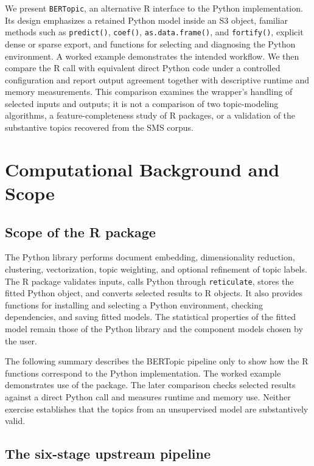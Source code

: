 \documentclass[12pt]{article}
\newcommand{\pkg}[1]{\texttt{#1}}
\newcommand{\code}[1]{\texttt{#1}}
\begin{document}
We present \pkg{BERTopic}, an alternative R interface to the Python implementation. Its design emphasizes a retained Python model inside an S3 object, familiar methods such as \code{predict()}, \code{coef()}, \code{as.data.frame()}, and \code{fortify()}, explicit dense or sparse export, and functions for selecting and diagnosing the Python environment. A worked example demonstrates the intended workflow. We then compare the R call with equivalent direct Python code under a controlled configuration and report output agreement together with descriptive runtime and memory measurements. This comparison examines the wrapper's handling of selected inputs and outputs; it is not a comparison of two topic-modeling algorithms, a feature-completeness study of R packages, or a validation of the substantive topics recovered from the SMS corpus.

\section{Computational Background and Scope}

\subsection{Scope of the R package}

The Python library performs document embedding, dimensionality reduction, clustering, vectorization, topic weighting, and optional refinement of topic labels. The R package validates inputs, calls Python through \pkg{reticulate}, stores the fitted Python object, and converts selected results to R objects. It also provides functions for installing and selecting a Python environment, checking dependencies, and saving fitted models. The statistical properties of the fitted model remain those of the Python library and the component models chosen by the user.

The following summary describes the BERTopic pipeline only to show how the R functions correspond to the Python implementation. The worked example demonstrates use of the package. The later comparison checks selected results against a direct Python call and measures runtime and memory use. Neither exercise establishes that the topics from an unsupervised model are substantively valid.

\subsection{The six-stage upstream pipeline}
\end{document}
